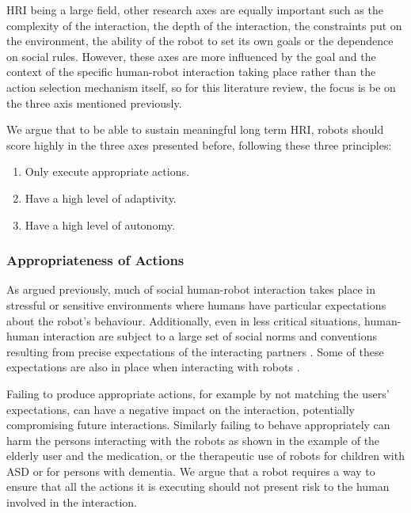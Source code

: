     HRI being a large field, other research axes are equally important such as
    the complexity of the interaction, the depth of the interaction, the
    constraints put on the environment, the ability of the robot to set its own
    goals or the dependence on social rules. However, these axes are more
    influenced by the goal and the context of the specific human-robot
    interaction taking place rather than the action selection mechanism itself,
    so for this literature review, the focus is be on the three axis mentioned
    previously.

    We argue that to be able to sustain meaningful long term HRI, robots should
    score highly in the three axes presented before, following these three
    principles:

    \begin{enumerate}
        \item Only execute appropriate actions.
        \item Have a high level of adaptivity.
        \item Have a high level of autonomy.
    \end{enumerate}

\subsubsection{Appropriateness of Actions} \label{ssec:appropriateness}
        
    As argued previously, much of social human-robot interaction takes place in
    stressful or sensitive environments where humans have particular
    expectations about the robot's behaviour. Additionally, even in less
    critical situations, human-human interaction are subject to a large set of
    social norms and conventions resulting from precise expectations of the
    interacting partners \citep{sherif1936psychology}. Some of these
    expectations are also in place when interacting with robots
    \citep{bartneck2004design}.
	
    Failing to produce appropriate actions, for example by not matching the
    users' expectations, can have a negative impact on the interaction,
    potentially compromising future interactions. Similarly failing to behave
    appropriately can harm the persons interacting with the robots as shown in
    the example of the elderly user and the medication, or the therapeutic use
    of robots for children with ASD or for persons with dementia.  We argue that
    a robot requires a way to ensure that all the actions it is executing should
    not present risk to the human involved in the interaction.
	
